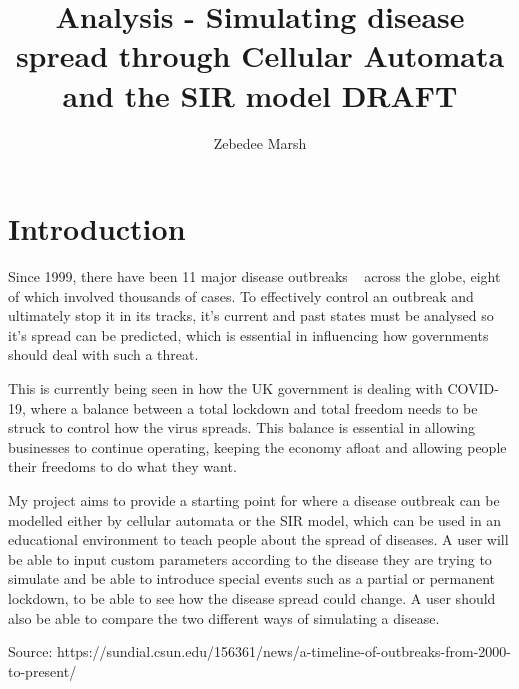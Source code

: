 \documentclass[11pt, a4paper]{article}
\author{Zebedee Marsh}
\title{Analysis - Simulating disease spread through Cellular Automata and the SIR model DRAFT}
\begin{document}
    
\maketitle
\tableofcontents
\newpage

\section{Introduction}
Since 1999, there have been 11 major disease outbreaks ~\cite{moran-perez_2020} across the globe, eight of which involved thousands of cases. To effectively control an outbreak and ultimately stop it in its tracks, it's current and past states must be analysed so it's spread can be predicted, which is essential in influencing how governments should deal with such a threat.

This is currently being seen in how the UK government is dealing with COVID-19, where a balance between a total lockdown and total freedom needs to be struck to control how the virus spreads. This balance is essential in allowing businesses to continue operating, keeping the economy afloat and allowing people their freedoms to do what they want.

My project aims to provide a starting point for where a disease outbreak can be modelled either by cellular automata or the SIR model, which can be used in an educational environment to teach people about the spread of diseases. A user will be able to input custom parameters according to the disease they are trying to simulate and be able to introduce special events such as a partial or permanent lockdown, to be able to see how the disease spread could change. A user should also be able to compare the two different ways of simulating a disease.

Source: https://sundial.csun.edu/156361/news/a-timeline-of-outbreaks-from-2000-to-present/
\end{document}
